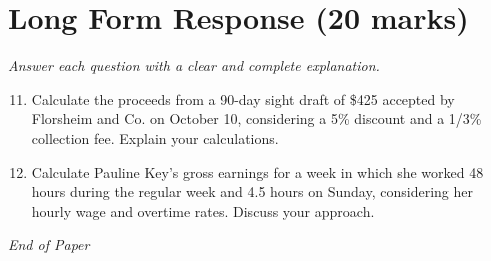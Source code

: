 \documentclass[12pt]{article}
\begin{document}
\section*{Long Form Response (20 marks)}
\textit{Answer each question with a clear and complete explanation.}
\begin{enumerate}[label=\arabic*.]
\setcounter{enumi}{10}
\item Calculate the proceeds from a 90-day sight draft of \$425 accepted by Florsheim and Co. on October 10, considering a 5\% discount and a 1/3\% collection fee. Explain your calculations.
\item Calculate Pauline Key's gross earnings for a week in which she worked 48 hours during the regular week and 4.5 hours on Sunday, considering her hourly wage and overtime rates. Discuss your approach.
\end{enumerate}

\vfill
\noindent\textit{End of Paper}
\end{document}
